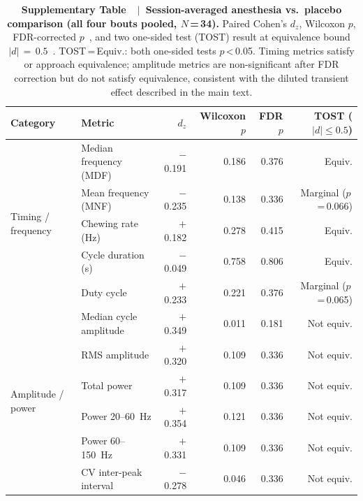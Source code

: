 \label{fig:supp_tost}
\begin{table}[!h]
\centering
\caption{\textbf{Supplementary Table~\thesuppfigure~$|$~Session-averaged
anesthesia vs.\ placebo comparison (all four bouts pooled, $N$\,=\,34).}
Paired Cohen's $d_z$, Wilcoxon $p$, FDR-corrected $p$~\cite{Benjamini1995},
and two one-sided test (TOST) result at equivalence bound $|d|\,=\,0.5$~\cite{Lakens2017}.
TOST\,=\,Equiv.: both one-sided tests $p$\,<\,0.05.
Timing metrics satisfy or approach equivalence; amplitude metrics are
non-significant after FDR correction but do not satisfy equivalence,
consistent with the diluted transient effect described in the main text.}
\label{tab:tost_full}
\begin{tabular}{llrrrr}
\toprule
Category & Metric & $d_z$ & Wilcoxon $p$ & FDR $p$ & TOST ($|d|\leq0.5$) \\
\midrule
\multirow{5}{*}{Timing / frequency}
 & Median frequency (MDF)     & $-$0.191 & 0.186 & 0.376 & Equiv. \\
 & Mean frequency (MNF)       & $-$0.235 & 0.138 & 0.336 & Marginal ($p$\,=\,0.066) \\
 & Chewing rate (Hz)          & $+$0.182 & 0.278 & 0.415 & Equiv. \\
 & Cycle duration (s)         & $-$0.049 & 0.758 & 0.806 & Equiv. \\
 & Duty cycle                 & $+$0.233 & 0.221 & 0.376 & Marginal ($p$\,=\,0.065) \\
\midrule
\multirow{6}{*}{Amplitude / power}
 & Median cycle amplitude     & $+$0.349 & 0.011 & 0.181 & Not equiv. \\
 & RMS amplitude              & $+$0.320 & 0.109 & 0.336 & Not equiv. \\
 & Total power                & $+$0.317 & 0.109 & 0.336 & Not equiv. \\
 & Power 20--60~Hz            & $+$0.354 & 0.121 & 0.336 & Not equiv. \\
 & Power 60--150~Hz           & $+$0.331 & 0.109 & 0.336 & Not equiv. \\
 & CV inter-peak interval     & $-$0.278 & 0.046 & 0.336 & Not equiv. \\
\bottomrule
\end{tabular}
\end{table}

